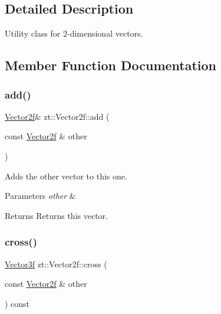 \subsection{Detailed Description}
Utility class for 2-\/dimensional vectors. 

\subsection{Member Function Documentation}
\mbox{\label{classzt_1_1_vector2f_ac87f5252d360bf9bad0934acbaa4cc07}} 
\subsubsection{\texorpdfstring{add()}{add()}}
{\footnotesize\ttfamily \hyperlink{classzt_1_1_vector2f}{Vector2f}\& zt\+::\+Vector2f\+::add (\begin{DoxyParamCaption}\item[{const \hyperlink{classzt_1_1_vector2f}{Vector2f} \&}]{other }\end{DoxyParamCaption})}



Adds the other vector to this one. 


\begin{DoxyParams}{Parameters}
{\em other} & \\
\hline
\end{DoxyParams}
\begin{DoxyReturn}{Returns}
Returns this vector. 
\end{DoxyReturn}
\mbox{\label{classzt_1_1_vector2f_a51b847203bcda779189114905d1dc77d}} 
\subsubsection{\texorpdfstring{cross()}{cross()}}
{\footnotesize\ttfamily \hyperlink{classzt_1_1_vector3f}{Vector3f} zt\+::\+Vector2f\+::cross (\begin{DoxyParamCaption}\item[{const \hyperlink{classzt_1_1_vector2f}{Vector2f} \&}]{other }\end{DoxyParamCaption}) const}



